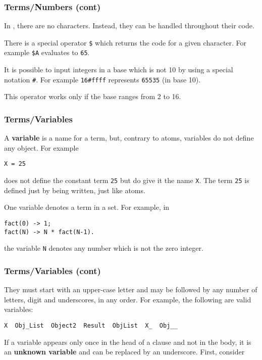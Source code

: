 %
\begin{frame}[containsverbatim]
\frametitle{Terms/Numbers (cont)}

In \Erlang, there are no characters. Instead, they can be handled
throughout their \ASCII code.

\bigskip

There is a special operator \texttt{\$} which returns the \ASCII code
for a given character. For example \verb|$A| evaluates to \texttt{65}.

\bigskip

It is possible to input integers in a base which is not 10 by using a
special notation \texttt{\#}. For example \verb|16#ffff| represents
\texttt{65535} (in base 10). 

\bigskip

This operator works only if the base ranges from 2 to 16.

\end{frame}

%
\begin{frame}[containsverbatim]
\frametitle{Terms/Variables}

A \textbf{variable} is a name for a term, but, contrary to atoms,
variables do not define any object. For example
\begin{verbatim}
X = 25
\end{verbatim}
does not define the constant term \texttt{25} but do give it the name
\texttt{X}. The term \texttt{25} is defined just by being written,
just like atoms.

\bigskip

One variable denotes a term in a set. For example, in
\begin{verbatim}
fact(0) -> 1;
fact(N) -> N * fact(N-1).
\end{verbatim}
the variable \texttt{N} denotes any number which is not the zero
integer.

\end{frame}

%
\begin{frame}[containsverbatim]
\frametitle{Terms/Variables (cont)}

They must start with an upper-case letter and may be followed
by any number of letters, digit and underscores, in any order. For
example, the following are valid variables: 
\begin{verbatim}
X  Obj_List  Object2  Result  ObjList  X_  Obj__
\end{verbatim}
If a variable appears only once in the head of a clause and not in the
body, it is an \textbf{unknown variable} and can be replaced by an
underscore. First, consider

\end{frame}

